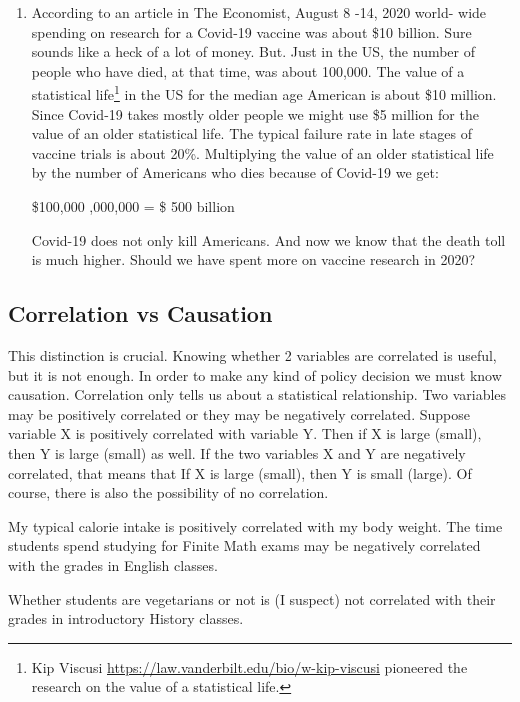 \documentclass[
]{book}
\begin{document}
\begin{enumerate}
\def\labelenumi{\arabic{enumi}.}
\setcounter{enumi}{2}
\item
  According to an article in The Economist, August 8 -14, 2020 world- wide spending on research for a Covid-19 vaccine was about \$10 billion. Sure sounds like a heck of a lot of money. But. Just in the US, the number of people who have died, at that time, was about 100,000. The value of a statistical life\footnote{Kip Viscusi \url{https://law.vanderbilt.edu/bio/w-kip-viscusi} pioneered the research on the value of a statistical life.} in the US for the median age American is about \$10 million. Since Covid-19 takes mostly older people we might use \$5 million for the value of an older statistical life. The typical failure rate in late stages of vaccine trials is about 20\%. Multiplying the value of an older statistical life by the number of Americans who dies because of Covid-19 we get:

  \$100,000  ,000,000 = \$ 500 billion

  Covid-19 does not only kill Americans. And now we know that the death toll is much higher. Should we have spent more on vaccine research in 2020?
\end{enumerate}

\hypertarget{correlation-vs-causation}{%
\subsection{Correlation vs Causation}\label{correlation-vs-causation}}

This distinction is crucial. Knowing whether 2 variables are correlated is useful, but it is not enough. In order to make any kind of policy decision we must know causation. Correlation only tells us about a statistical relationship. Two variables may be positively correlated or they may be negatively correlated. Suppose variable X is positively correlated with variable Y. Then if X is large (small), then Y is large (small) as well. If the two variables X and Y are negatively correlated, that means that If X is large (small), then Y is small (large). Of course, there is also the possibility of no correlation.

My typical calorie intake is positively correlated with my body weight.
The time students spend studying for Finite Math exams may be negatively correlated with the grades in English classes.

Whether students are vegetarians or not is (I suspect) not correlated with their grades in introductory History classes.
\end{document}
